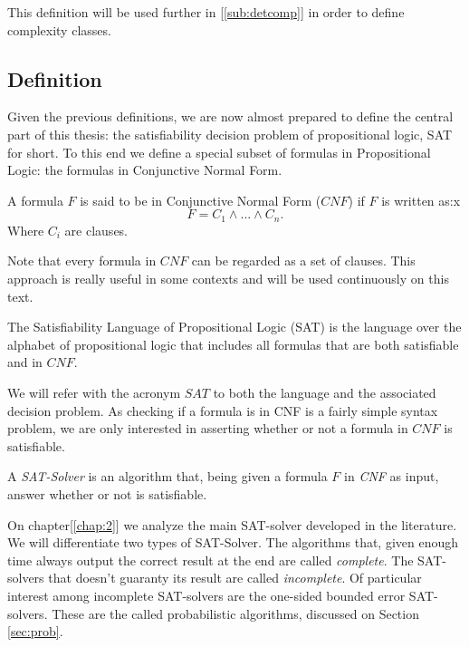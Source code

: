 This definition will be used further in [\ref{sub:detcomp}] in order to define complexity classes.


\subsection{Definition}

Given the previous definitions, we are now almost prepared to define the central part of this thesis: the satisfiability decision problem of propositional logic, SAT for short. To this end we define a special subset of formulas in Propositional Logic: the formulas in Conjunctive Normal Form.

\begin{definition}
  A formula $F$ is said to be in Conjunctive Normal Form ($CNF$) if $F$ is written as:x
  $$F = C_1\wedge ... \wedge C_n.$$
  Where $C_i$  are clauses.
\end{definition}

Note that every formula in $CNF$ can be regarded as a set of clauses. This approach is really useful in some contexts and will be used continuously on this text.

\begin{definition}
  The Satisfiability Language of Propositional Logic (SAT) is the language over the alphabet of propositional logic that includes all formulas that are both satisfiable and in $CNF$.
\end{definition}

We will refer with the acronym $SAT$ to both the language and the associated decision problem. As checking if a formula is in CNF is a fairly simple syntax problem, we are only interested in asserting whether or not a formula in $CNF$ is satisfiable.

\begin{definition}
  A \emph{SAT-Solver} is an algorithm that, being given a formula $F$ in \emph{CNF} as input, answer whether or not is satisfiable.
\end{definition}

On chapter[\ref{chap:2}] we analyze the main SAT-solver developed in the literature. We will differentiate two types of SAT-Solver. The algorithms that, given enough time always output the correct result at the end are called \emph{complete}. The SAT-solvers that doesn't guaranty its result are called \emph{incomplete}. Of particular interest among incomplete SAT-solvers are the one-sided bounded error SAT-solvers. These are the called probabilistic algorithms, discussed on Section \ref{sec:prob}.


